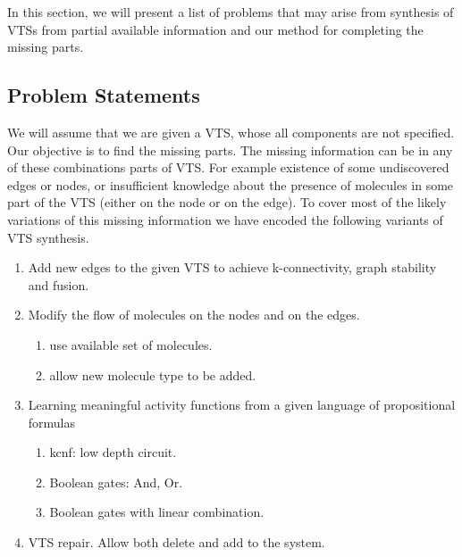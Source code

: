 In this section, we will present a list of problems that may arise from
synthesis of VTSs from partial available information
and our method for completing the missing parts.

\subsection{Problem Statements}

We will assume that we are given a VTS, whose all components
are not specified.
%
Our objective is to find the missing parts.
%
The missing information can be in any of these combinations parts of
VTS. For example existence of some undiscovered edges or nodes, or
insufficient knowledge about the presence of molecules in some part of
the VTS (either on the node or on the edge).
%
To cover most of the likely variations of this missing information we
have encoded the following variants of VTS synthesis.



%
%
\begin{enumerate}[label=\Alph*]
\item  Add new edges to the given VTS to achieve k-connectivity, graph stability and fusion. 
\item  Modify the flow of molecules on the nodes and on the edges.
  \begin{enumerate}
  	\item use available set of molecules.
    \item allow new molecule type to be added.     
  \end{enumerate}        
\item Learning meaningful activity functions from a given language of
  propositional formulas
  \begin{enumerate}
    \item kcnf: low depth circuit.
    \item Boolean gates: And, Or.
    \item Boolean gates with linear combination.  
    \end{enumerate}        
\item  VTS repair. Allow both delete and add to the system.
\end{enumerate}

